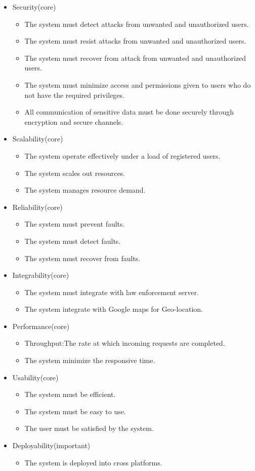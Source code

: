 \documentclass[a4paper,12pt]{article}
\begin{document}
	\begin{itemize}
	\item Security(core)
	\begin{itemize}
		\item The system must detect attacks from unwanted and unauthorized users.
		\item The system must resist attacks from unwanted and unauthorized users.
		\item The system must recover from attack from unwanted and unauthorized users.
		\item The system must minimize access and permissions given to users who do not have the
			required privileges.
		\item All communication of sensitive data must be done securely through
			encryption and secure channels.
	\end{itemize}
	\item Scalability(core)
	\begin{itemize}
		\item The system operate effectively under a load of registered users.
		\item The system scales out resources.
		\item The system manages resource demand.
	\end{itemize}
	\item Reliability(core)
		\begin{itemize}
			\item The system must prevent faults.
			\item The system must detect faults.
			\item The system must recover from faults.
		\end{itemize}
	\item Integrability(core)
		\begin{itemize}
			\item The system must integrate with law enforcement server.
			\item The system integrate with Google maps for Geo-location.
		\end{itemize}
	\item Performance(core)
		\begin{itemize}
			\item Throughput:The rate at which incoming requests are completed.
			\item The system minimize the responsive time.
		\end{itemize}
	\item Usability(core)
		\begin{itemize}
			\item The system must be efficient.
			\item The system must be easy to use.
			\item The user must be satisfied by the system.
		\end{itemize}
	\item Deployability(important)
		\begin{itemize}
			\item The system is deployed into cross platforms.
		\end{itemize}
	\end{itemize}
\end{document}
